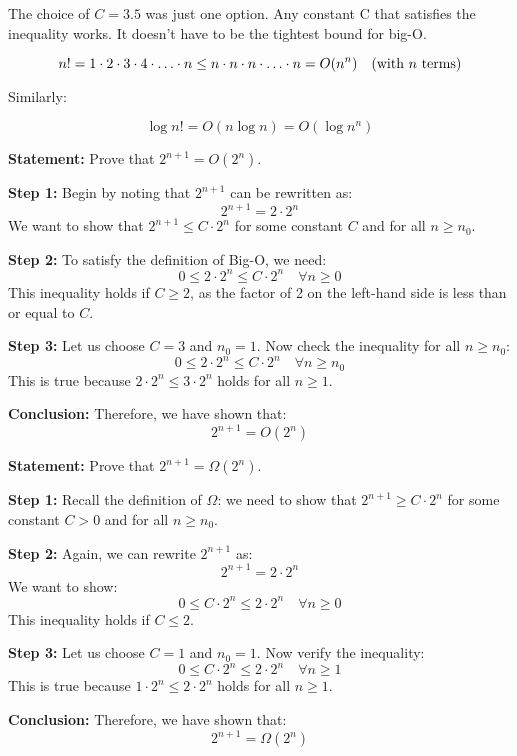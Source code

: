     \begin{warning}
        The choice of $C=3.5$ was just one option. Any constant C that satisfies the inequality works. It doesn't have to be the tightest bound for big-O.
    \end{warning}

    \begin{example}
        \[
        n! = 1 \cdot 2 \cdot 3 \cdot 4 \cdot \ldots \cdot n \leq n \cdot n \cdot n \cdot \ldots \cdot n = O(n^n) \quad \text{(with \( n \) terms)}
        \]

        Similarly:

        \[
        \log n! = O(n \log n) = O(\log n^n)
        \]
    \end{example}

    \begin{example}
        \textbf{Statement:} Prove that $2^{n+1} = O(2^n)$.
        
        \textbf{Step 1:} Begin by noting that $2^{n+1}$ can be rewritten as:
        \[
        2^{n+1} = 2 \cdot 2^n
        \]
        We want to show that $2^{n+1} \leq C \cdot 2^n$ for some constant $C$ and for all $n \geq n_0$.
        
        \textbf{Step 2:} To satisfy the definition of Big-O, we need:
        \[
        0 \leq 2 \cdot 2^n \leq C \cdot 2^n \quad \forall n \geq 0
        \]
        This inequality holds if $C \geq 2$, as the factor of 2 on the left-hand side is less than or equal to $C$.
        
        \textbf{Step 3:} Let us choose $C = 3$ and $n_0 = 1$. Now check the inequality for all $n \geq n_0$:
        \[
        0 \leq 2 \cdot 2^n \leq C \cdot 2^n \quad \forall n \geq n_0
        \]
        This is true because $2 \cdot 2^n \leq 3 \cdot 2^n$ holds for all $n \geq 1$.
        
        \textbf{Conclusion:} Therefore, we have shown that:
        \[
        2^{n+1} = O(2^n)
        \]
    \end{example}
        

    \begin{example}
        \textbf{Statement:} Prove that $2^{n+1} = \Omega(2^n)$.
        
        \textbf{Step 1:} Recall the definition of $\Omega$: we need to show that $2^{n+1} \geq C \cdot 2^n$ for some constant $C > 0$ and for all $n \geq n_0$.
        
        \textbf{Step 2:} Again, we can rewrite $2^{n+1}$ as:
        \[
        2^{n+1} = 2 \cdot 2^n
        \]
        We want to show:
        \[
        0 \leq C \cdot 2^n \leq 2 \cdot 2^n \quad \forall n \geq 0
        \]
        This inequality holds if $C \leq 2$.
        
        \textbf{Step 3:} Let us choose $C = 1$ and $n_0 = 1$. Now verify the inequality:
        \[
        0 \leq C \cdot 2^n \leq 2 \cdot 2^n \quad \forall n \geq 1
        \]
        This is true because $1 \cdot 2^n \leq 2 \cdot 2^n$ holds for all $n \geq 1$.
        
        \textbf{Conclusion:} Therefore, we have shown that:
        \[
        2^{n+1} = \Omega(2^n)
        \]
    \end{example}


